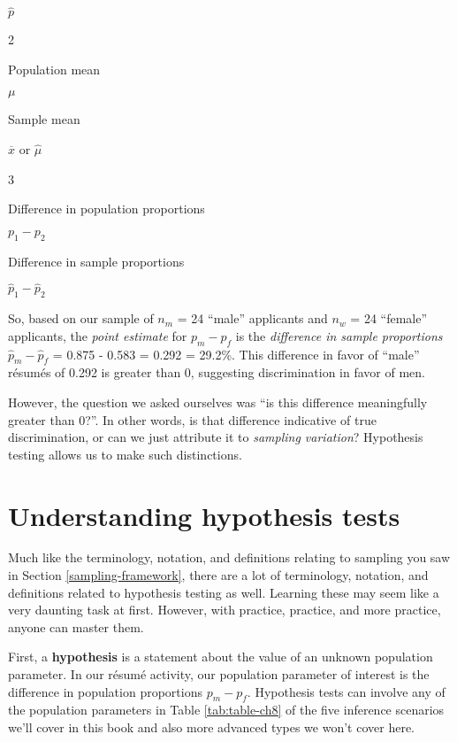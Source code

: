 \documentclass[
]{book}
\begin{document}
\(\widehat{p}\)

2

Population mean

\(\mu\)

Sample mean

\(\overline{x}\) or \(\widehat{\mu}\)

3

Difference in population proportions

\(p_1 - p_2\)

Difference in sample proportions

\(\widehat{p}_1 - \widehat{p}_2\)

So, based on our sample of \(n_m\) = 24 ``male'' applicants and \(n_w\) = 24 ``female'' applicants, the \emph{point estimate} for \(p_{m} - p_{f}\) is the \emph{difference in sample proportions} \(\widehat{p}_{m} -\widehat{p}_{f}\) = 0.875 - 0.583 = 0.292 = 29.2\%. This difference in favor of ``male'' résumés of 0.292 is greater than 0, suggesting discrimination in favor of men.

However, the question we asked ourselves was ``is this difference meaningfully greater than 0?''. In other words, is that difference indicative of true discrimination, or can we just attribute it to \emph{sampling variation}? Hypothesis testing allows us to make such distinctions.

\hypertarget{understanding-ht}{%
\section{Understanding hypothesis tests}\label{understanding-ht}}

Much like the terminology, notation, and definitions relating to sampling you saw in Section \ref{sampling-framework}, there are a lot of terminology, notation, and definitions related to hypothesis testing as well. Learning these may seem like a very daunting task at first. However, with practice, practice, and more practice, anyone can master them.

First, a \textbf{hypothesis}  is a statement about the value of an unknown population parameter. In our résumé activity, our population parameter of interest is the difference in population proportions \(p_{m} - p_{f}\). Hypothesis tests can involve any of the population parameters in Table \ref{tab:table-ch8} of the five inference scenarios we'll cover in this book and also more advanced types we won't cover here.
\end{document}
